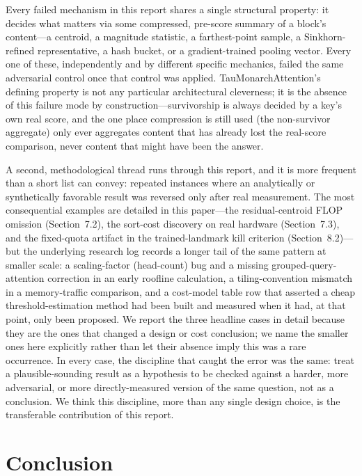 \documentclass[11pt]{article}
\begin{document}
Every failed mechanism in this report shares a single structural property: it decides what
matters via some compressed, pre-score summary of a block's content---a centroid, a
magnitude statistic, a farthest-point sample, a Sinkhorn-refined representative, a hash
bucket, or a gradient-trained pooling vector. Every one of these, independently and by
different specific mechanics, failed the same adversarial control once that control was
applied. TauMonarchAttention's defining property is not any particular architectural
cleverness; it is the absence of this failure mode by construction---survivorship is
always decided by a key's own real score, and the one place compression is still used (the
non-survivor aggregate) only ever aggregates content that has already lost the real-score
comparison, never content that might have been the answer.

A second, methodological thread runs through this report, and it is more frequent than a
short list can convey: repeated instances where an analytically or synthetically favorable
result was reversed only after real measurement. The most consequential examples are
detailed in this paper---the residual-centroid FLOP omission (Section~7.2), the
sort-cost discovery on real hardware (Section~7.3), and the fixed-quota artifact in
the trained-landmark kill criterion (Section~8.2)---but the underlying research log
records a longer tail of the same pattern at smaller scale: a scaling-factor
(head-count) bug and a missing grouped-query-attention correction in an early roofline
calculation, a tiling-convention mismatch in a memory-traffic comparison, and a
cost-model table row that asserted a cheap threshold-estimation method had been built and
measured when it had, at that point, only been proposed. We report the three headline
cases in detail because they are the ones that changed a design or cost conclusion; we
name the smaller ones here explicitly rather than let their absence imply this was a rare
occurrence. In every case, the discipline that caught the error was the same: treat a
plausible-sounding result as a hypothesis to be checked against a harder, more
adversarial, or more directly-measured version of the same question, not as a conclusion.
We think this discipline, more than any single design choice, is the transferable
contribution of this report.

\section{Conclusion}
\end{document}
